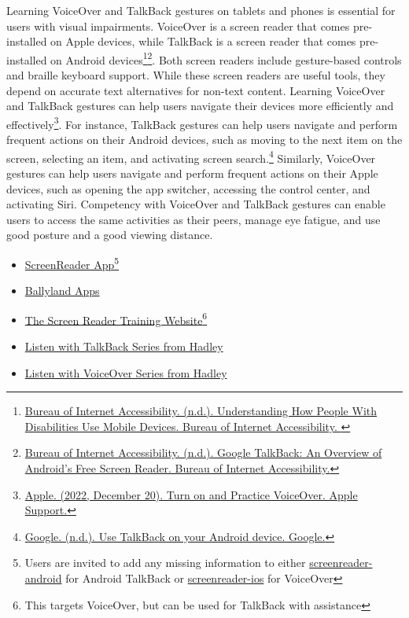 Learning VoiceOver and TalkBack gestures on tablets and phones is essential for users with visual impairments. VoiceOver is a screen reader that comes pre-installed on Apple devices, while TalkBack is a screen reader that comes pre-installed on Android devices\footnote{\raggedright \href{https://www.boia.org/blog/understanding-how-people-with-disabilities-use-mobile-devices}{Bureau of Internet Accessibility. (n.d.). Understanding How People With Disabilities Use Mobile Devices. Bureau of Internet Accessibility. }}\footnote{\raggedright \href{https://www.boia.org/blog/google-talkback-an-overview-of-androids-free-screen-reader}{Bureau of Internet Accessibility. (n.d.). Google TalkBack: An Overview of Android's Free Screen Reader. Bureau of Internet Accessibility.}}. Both screen readers include gesture-based controls and braille keyboard support. While these screen readers are useful tools, they depend on accurate text alternatives for non-text content. Learning VoiceOver and TalkBack gestures can help users navigate their devices more efficiently and effectively\footnote{\raggedright \href{https://support.apple.com/guide/iphone/turn-on-and-practice-voiceover-iph3e2e415f/ios}{Apple. (2022, December 20). Turn on and Practice VoiceOver. Apple Support.}}. For instance, TalkBack gestures can help users navigate and perform frequent actions on their Android devices, such as moving to the next item on the screen, selecting an item, and activating screen search.\footnote{\raggedright \href{https://support.google.com/accessibility/android/answer/6151827?hl=en}{Google. (n.d.). Use TalkBack on your Android device. Google.}} Similarly, VoiceOver gestures can help users navigate and perform frequent actions on their Apple devices, such as opening the app switcher, accessing the control center, and activating Siri. Competency with VoiceOver and TalkBack gestures can enable users to access the same activities as their peers, manage eye fatigue, and use good posture and a good viewing distance.

\begin{itemize}
 \item \href{https://screenreader.app/}{ScreenReader App}\footnote{\raggedright Users are invited to add any missing information to either \href{https://github.com/appt-org/screenreader-android}{screenreader-android} for Android TalkBack or \href{https://github.com/appt-org/screenreader-ios}{screenreader-ios} for VoiceOver}
 \item \href{https://www.sonokids.org/ballyland-early-learning/ballyland-game-apps/}{Ballyland Apps}
 \item \href{https://srt.csb-cde.ca.gov/}{The Screen Reader Training Website}\footnote{\raggedright This targets VoiceOver, but can be used for TalkBack with assistance}
 \item \href{https://hadley.edu/workshops/listen-with-talkback-series}{Listen with TalkBack Series from Hadley}
 \item \href{https://hadley.edu/workshops/listen-with-voiceover-series}{Listen with VoiceOver Series from Hadley}
\end{itemize}

